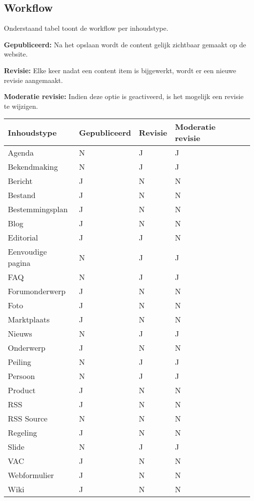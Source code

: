 \clearpage
\subsection{Workflow}\label{workflow}

Onderstaand tabel toont de workflow per inhoudstype. 

\textbf{Gepubliceerd:} Na het opslaan wordt de content gelijk zichtbaar gemaakt op de website.

\textbf{Revisie:} Elke keer nadat een content item is bijgewerkt, wordt er een nieuwe revisie aangemaakt.

\textbf{Moderatie revisie:} Indien deze optie is geactiveerd, is het mogelijk een revisie te wijzigen.

\begin{tabularx}{\textwidth}{ | p{5cm} |X|X|X|X| }
  \hline
  Inhoudstype & Gepubliceerd & Revisie & Moderatie revisie \\ \hline
  Agenda & N & J  & J  \\ \hline
  Bekendmaking & N & J  & J  \\ \hline
  Bericht  & J & N  & N  \\ \hline
  Bestand  & J & N  & N  \\ \hline
  Bestemmingsplan  & J & N  & N  \\ \hline
  Blog  & J & N  & N  \\ \hline
  Editorial  & J & J  & N  \\ \hline
  Eenvoudige pagina  & N & J  & J  \\ \hline
  FAQ  & N & J  & J  \\ \hline
  Forumonderwerp  & J & N  & N  \\ \hline
  Foto  & J & N  & N  \\ \hline
  Marktplaats  & J & N  & N  \\ \hline
  Nieuws  & N & J  & J  \\ \hline
  Onderwerp  & J & N  & N  \\ \hline
  Peiling  & N & J  & J  \\ \hline
  Persoon  & N & J  & J  \\ \hline
  Product  & J & N  & N  \\ \hline
  RSS  & J & N  & N  \\ \hline
  RSS Source  & N & N  & N  \\ \hline
  Regeling  & J & N  & N  \\ \hline
  Slide  & N & J  & J  \\ \hline
  VAC  & J & N  & N  \\ \hline
  Webformulier  & J & N  & N  \\ \hline
  Wiki  & J & N  & N  \\ \hline
\end{tabularx}